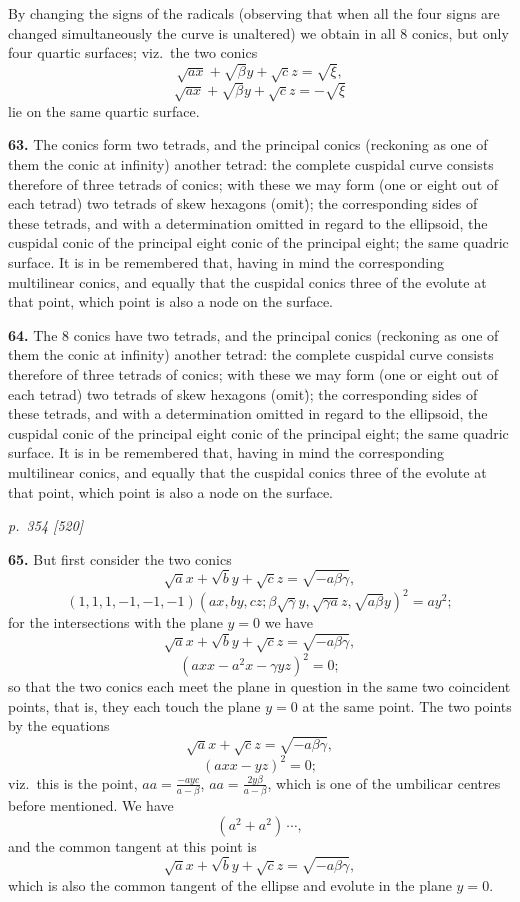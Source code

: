 \documentclass[11pt,a4paper]{article}
\theoremstyle{plain}
\theoremstyle{definition}
\begin{document}
By changing the signs of the radicals (observing that when all the four signs are changed simultaneously the curve is unaltered) we obtain in all 8 conics, but only four quartic surfaces; viz.\ the two conics
\[
\sqrt{a x} + \sqrt{\beta}y + \sqrt{c}z = \sqrt{\xi},
\]
\[
\sqrt{a x} + \sqrt{\beta}y + \sqrt{c}z = -\sqrt{\xi}
\]
lie on the same quartic surface.

\textbf{63.} The conics form two tetrads, and the principal conics (reckoning as one of them the conic at infinity) another tetrad: the complete cuspidal curve consists therefore of three tetrads of conics; with these we may form (one or eight out of each tetrad) two tetrads of skew hexagons (omit\.); the corresponding sides of these tetrads, and with a determination omitted in regard to the ellipsoid, the cuspidal conic of the principal eight conic of the principal eight; the same quadric surface. It is in be remembered that, having in mind the corresponding multilinear conics, and equally that the cuspidal conics three of the evolute at that point, which point is also a node on the surface.

\textbf{64.} The 8 conics have two tetrads, and the principal conics (reckoning as one of them the conic at infinity) another tetrad: the complete cuspidal curve consists therefore of three tetrads of conics; with these we may form (one or eight out of each tetrad) two tetrads of skew hexagons (omit\.); the corresponding sides of these tetrads, and with a determination omitted in regard to the ellipsoid, the cuspidal conic of the principal eight conic of the principal eight; the same quadric surface. It is in be remembered that, having in mind the corresponding multilinear conics, and equally that the cuspidal conics three of the evolute at that point, which point is also a node on the surface.

\clearpage

\bigskip
\textit{p.~354 [520]}
\smallskip

\textbf{65.} But first consider the two conics
\[
\sqrt{a}x + \sqrt{b}y + \sqrt{c}z = \sqrt{-a\beta\gamma},
\]
\[
(1, 1, 1, -1, -1, -1)(a x, b y, c z; \beta\sqrt{\gamma}y, \sqrt{\gamma a}z, \sqrt{a\beta}y)^2 = a y^2;
\]
for the intersections with the plane $y = 0$ we have
\[
\sqrt{a}x + \sqrt{b}y + \sqrt{c}z = \sqrt{-a\beta\gamma},
\]
\[
(a x x - a^2 x - \gamma y z)^2 = 0;
\]
so that the two conics each meet the plane in question in the same two coincident points, that is, they each touch the plane $y = 0$ at the same point. The two points by the equations
\[
\sqrt{a}x + \sqrt{c}z = \sqrt{-a\beta\gamma},
\]
\[
(a x x - y z)^2 = 0;
\]
viz.\ this is the point, $a a = \tfrac{-a y c}{a - \beta}$, $a a = \tfrac{2y\beta}{a - \beta}$, which is one of the umbilicar centres before mentioned. We have
\[
(a^2 + a^2)\,\cdots,
\]
and the common tangent at this point is
\[
\sqrt{a}x + \sqrt{b}y + \sqrt{c}z = \sqrt{-a\beta\gamma},
\]
which is also the common tangent of the ellipse and evolute in the plane $y = 0$.
\end{document}
